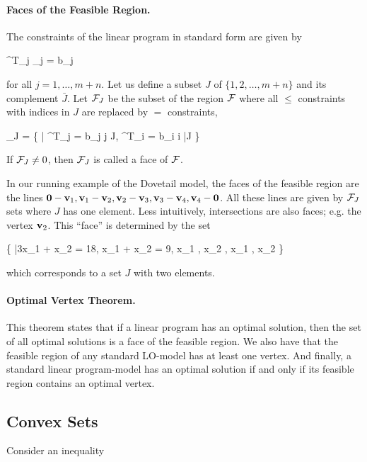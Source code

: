 \paragraph{Faces of the Feasible Region.} The constraints of the linear program in standard form are given by

\bee
\abf^T_j \xbf_j = b_j
\eee

for all $j = 1, \ldots, m+n$. Let us define a subset $J$ of $\{1,2,\ldots, m+n\}$ and its complement $\bar{J}$. Let $\mathcal{F}_J$ be the subset of the region $\mathcal{F}$ where all $\leq$ constraints with indices in $J$ are replaced by $=$ constraints,

\bee
\Fc_J = \{ \xbf \in \mR | \abf^T_j \xbf = b_j \forall  j \in J, \abf^T_i \xbf = b_i \forall  i \in \bar{J} \}
\eee

If $\mathcal{F}_J \neq 0$, then $\mathcal{F}_J$ is called a face of $\mathcal{F}$.

In our running example of the Dovetail model, the faces of the feasible region are the lines $\mathbf{0} - \mathbf{v}_1, \mathbf{v}_1 - \mathbf{v}_2, \mathbf{v}_2 - \mathbf{v}_3, \mathbf{v}_3 - \mathbf{v}_4, \mathbf{v}_4 - \mathbf{0}$. All these lines are given by $\mathcal{F}_J$ sets where $J$ has one element. Less intuitively, intersections are also faces; e.g. the vertex $\mathbf{v}_2$. This ``face'' is determined by the set

\bee
\{ \xbf \in \mR |3x_1 + x_2 = 18, x_1 + x_2 = 9, x_1 , x_2 , x_1 , x_2  \}
\eee

which corresponds to a set $J$ with two elements.


\paragraph{Optimal Vertex Theorem.} This theorem states that if a linear program has an optimal solution, then the set of all optimal solutions is a face of the feasible region. We also have that the feasible region of any standard LO-model has at least one vertex. And finally, a standard linear program-model has an optimal solution if and only if its feasible region contains an optimal vertex.





\subsection{Convex Sets}

Consider an inequality

\bee
\Abf \xbf \leq \bbf
\eee

